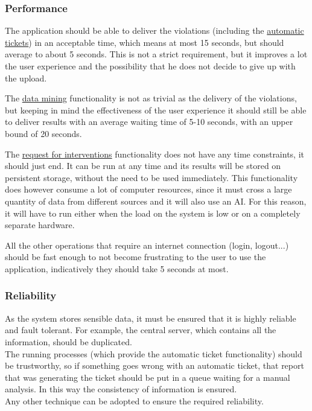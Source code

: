 \subsubsection{Performance}
    The application should be able to deliver the violations (including the
    \hyperref[sec:automatic_tickets]{automatic tickets}) in an acceptable time,
    which means at most 15 seconds, but should average to about 5 seconds.
    This is not a strict requirement, but it improves a lot the user experience and the possibility
    that he does not decide to give up with the upload.

    The 
    \hyperref[sec:data_mining]{data mining} 
    functionality is not as trivial as the delivery of the violations, but keeping in 
    mind the effectiveness of the user experience it should still be able to deliver results with an
    average waiting time of 5-10 seconds, with an upper bound of 20 seconds.

    The
    \hyperref[sec:request_for_interventions]{request for interventions}
    functionality does not have any time constraints, it should just end. It can be run at any time and
    its results will be stored on persistent storage, without the need to be used immediately.
    This functionality does however consume a lot of computer resources, since it must cross a large quantity
    of data from different sources and it will also use an AI. For this reason, it will have to run
    either when the load on the system is low or on a completely separate hardware.

    All the other operations that require an internet connection (login, logout...) should be fast enough
    to not become frustrating to the user to use the application, indicatively they should take 5 seconds at most.
    
\subsubsection{Reliability}
	As the system stores sensible data, it must be ensured	that it is highly reliable and fault tolerant. For example, the	central	server,	which contains all the information, should be duplicated.\\The running processes (which provide the automatic ticket functionality) should be trustworthy, so if something goes wrong with an automatic ticket, that report that was generating the ticket should be put in a queue waiting for a manual analysis. In this way the consistency of information is ensured.\\Any other technique can be	adopted	to	ensure	the	required reliability.
    
